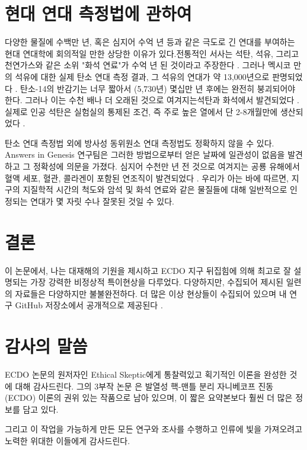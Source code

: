 \documentclass[10pt,twocolumn,letterpaper]{article}
\begin{document}
\section{현대 연대 측정법에 관하여}

다양한 물질에  수백만 년, 혹은 심지어 수억 년 등과 같은 극도로 긴 연대를  부여하는 현대 연대학에 회의적일 만한 상당한 이유가 있다.전통적인 서사는 석탄, 석유, 그리고 천연가스와 같은 소위 "화석 연료"가 수억 년 된 것이라고 주장한다 \cite{104}. 그러나 멕시코 만의 석유에 대한 실제 탄소 연대 측정 결과, 그 석유의 연대가 약 13,000년으로 판명되었다 \cite{105}. 탄소-14의 반감기는 너무 짧아서 (5,730년) 몇십만 년 후에는 완전히 붕괴되어야 한다. 그러나 이는 수천 배나 더 오래된 것으로 여겨지는석탄과 화석에서 발견되었다 \cite{106}. 실제로 인공 석탄은 실험실의 통제된 조건, 즉 주로 높은 열에서 단 2-8개월만에 생산되었다 \cite{107}.

탄소 연대 측정법 외에  방사성 동위원소 연대 측정법도 정확하지 않을 수 있다. Answers in Genesis 연구팀은 그러한 방법으로부터 얻은 날짜에 일관성이 없음을 발견하고 그 정확성에 의문을 가졌다\cite{108}. 심지어 수천만 년 전 것으로 여겨지는 공룡 유해에서 혈액 세포, 혈관, 콜라겐이 포함된 연조직이 발견되었다 \cite{109,110}. 우리가 아는 바에 따르면, 지구의 지질학적 시간의 척도와 암석 및 화석 연료와 같은 물질들에 대해 일반적으로 인정되는 연대가 몇 자릿 수나 잘못된 것일 수 있다.

\section{결론}

이 논문에서, 나는 대재해의 기원을 제시하고 ECDO 지구 뒤집힘에 의해 최고로 잘 설명되는 가장 강력한 비정상적 특이현상을 다루었다. 다양하지만, 수집되어 제시된 일련의 자료들은 다양하지만 불불완전하다.  더 많은 이상 현상들이 수집되어 있으며 내 연구 GitHub 저장소에서 공개적으로 제공된다 \cite{2}.

\section{감사의 말씀}

 ECDO 논문의 원저자인 Ethical Skeptic에게 통찰력있고 획기적인 이론을 완성한 것에 대해 감사드린다. 그의 3부작 논문 \cite{1}은 발열성 핵-맨틀 분리 자니베코프 진동 (ECDO) 이론의 권위 있는 작품으로 남아 있으며, 이 짧은 요약본보다 훨씬 더 많은 정보를 담고 있다.

그리고 이 작업을 가능하게 만든 모든 연구와 조사를 수행하고 인류에 빛을 가져오려고 노력한 위대한 이들에게 감사드린다.

{\small
\renewcommand{\refname}{참고문헌}


}
\end{document}
